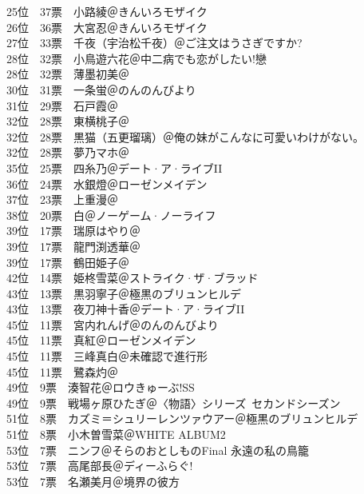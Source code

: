 {    25位　37票　小路綾＠きんいろモザイク\\
    26位　36票　大宮忍＠きんいろモザイク\\
    27位　33票　千夜（宇治松千夜）＠ご注文はうさぎですか?\\
    28位　32票　小鳥遊六花＠中二病でも恋がしたい!戀\\
    28位　32票　薄墨初美＠\Saki\\
    30位　31票　一条蛍＠のんのんびより\\
    31位　29票　石戸霞＠\Saki\\
    32位　28票　東横桃子＠\Saki\\
    32位　28票　黒猫（五更瑠璃）＠俺の妹がこんなに可愛いわけがない。\\
    32位　28票　夢乃マホ＠\Saki\\
    35位　25票　四糸乃＠デート·ア·ライブII\\
    36位　24票　水銀燈＠ローゼンメイデン\\
    37位　23票　上重漫＠\Saki\\
    38位　20票　白＠ノーゲーム·ノーライフ\\
    39位　17票　瑞原はやり＠\Saki\\
    39位　17票　龍門渕透華＠\Saki\\
    39位　17票　鶴田姫子＠\Saki\\
    42位　14票　姫柊雪菜＠ストライク·ザ·ブラッド\\
    43位　13票　黒羽寧子＠極黒のブリュンヒルデ\\
    43位　13票　夜刀神十香＠デート·ア·ライブII\\
    45位　11票　宮内れんげ＠のんのんびより\\
    45位　11票　真紅＠ローゼンメイデン\\
    45位　11票　三峰真白＠未確認で進行形\\
    45位　11票　鷺森灼＠\Saki\\
    49位　9票　湊智花＠ロウきゅーぶ!SS\\
    49位　9票　戦場ヶ原ひたぎ＠〈物語〉シリーズ~セカンドシーズン\\
    51位　8票　カズミ＝シュリーレンツァウアー＠極黒のブリュンヒルデ\\
    51位　8票　小木曽雪菜＠WHITE ALBUM2\\
    53位　7票　ニンフ＠そらのおとしものFinal 永遠の私の鳥籠\\
    53位　7票　高尾部長＠ディーふらぐ!\\
    53位　7票　名瀬美月＠境界の彼方\\
}
